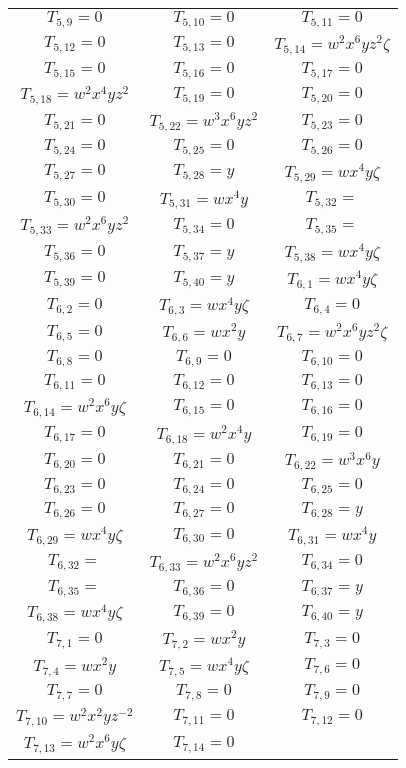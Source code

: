 \begin{longtable}{|c|c|c|}
$T_{5,9}= 0$&
$T_{5,10}= 0$&
$T_{5,11}= 0$\\
$T_{5,12}= 0$&
$T_{5,13}= 0$&
$T_{5,14}= w^2x^6yz^2\zeta$\\
$T_{5,15}= 0$&
$T_{5,16}= 0$&
$T_{5,17}= 0$\\
$T_{5,18}= w^2x^4yz^2$&
$T_{5,19}= 0$&
$T_{5,20}= 0$\\
$T_{5,21}= 0$&
$T_{5,22}= w^3x^6yz^2$&
$T_{5,23}= 0$\\
$T_{5,24}= 0$&
$T_{5,25}= 0$&
$T_{5,26}= 0$\\
$T_{5,27}= 0$&
$T_{5,28}= y$&
$T_{5,29}= wx^4y\zeta$\\
$T_{5,30}= 0$&
$T_{5,31}= wx^4y$&
$T_{5,32}= $\\
$T_{5,33}= w^2x^6yz^2$&
$T_{5,34}= 0$&
$T_{5,35}= $\\
$T_{5,36}= 0$&
$T_{5,37}= y$&
$T_{5,38}= wx^4y\zeta$\\
$T_{5,39}= 0$&
$T_{5,40}= y$&
$T_{6,1}= wx^4y\zeta$\\
$T_{6,2}= 0$&
$T_{6,3}= wx^4y\zeta$&
$T_{6,4}= 0$\\
$T_{6,5}= 0$&
$T_{6,6}= wx^2y$&
$T_{6,7}= w^2x^6yz^2\zeta$\\
$T_{6,8}= 0$&
$T_{6,9}= 0$&
$T_{6,10}= 0$\\
$T_{6,11}= 0$&
$T_{6,12}= 0$&
$T_{6,13}= 0$\\
$T_{6,14}= w^2x^6y\zeta$&
$T_{6,15}= 0$&
$T_{6,16}= 0$\\
$T_{6,17}= 0$&
$T_{6,18}= w^2x^4y$&
$T_{6,19}= 0$\\
$T_{6,20}= 0$&
$T_{6,21}= 0$&
$T_{6,22}= w^3x^6y$\\
$T_{6,23}= 0$&
$T_{6,24}= 0$&
$T_{6,25}= 0$\\
$T_{6,26}= 0$&
$T_{6,27}= 0$&
$T_{6,28}= y$\\
$T_{6,29}= wx^4y\zeta$&
$T_{6,30}= 0$&
$T_{6,31}= wx^4y$\\
$T_{6,32}= $&
$T_{6,33}= w^2x^6yz^2$&
$T_{6,34}= 0$\\
$T_{6,35}= $&
$T_{6,36}= 0$&
$T_{6,37}= y$\\
$T_{6,38}= wx^4y\zeta$&
$T_{6,39}= 0$&
$T_{6,40}= y$\\
$T_{7,1}= 0$&
$T_{7,2}= wx^2y$&
$T_{7,3}= 0$\\
$T_{7,4}= wx^2y$&
$T_{7,5}= wx^4y\zeta$&
$T_{7,6}= 0$\\
$T_{7,7}= 0$&
$T_{7,8}= 0$&
$T_{7,9}= 0$\\
$T_{7,10}= w^2x^2yz^{-2}$&
$T_{7,11}= 0$&
$T_{7,12}= 0$\\
$T_{7,13}= w^2x^6y\zeta$&
$T_{7,14}= 0$&

\end{longtable}

